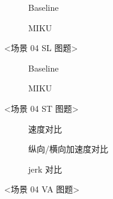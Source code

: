 \begin{figure}[H]
\centering
\begin{subfigure}[b]{\textwidth}
  \centering
  
  \caption{Baseline}
  \label{fig:exp_04_dense_construction_sl:a}
\end{subfigure}

\begin{subfigure}[b]{\textwidth}
  \centering
  
  \caption{MIKU}
  \label{fig:exp_04_dense_construction_sl:b}
\end{subfigure}
\caption{<场景 04 SL 图题>}
\label{fig:exp_04_dense_construction_sl}
\end{figure}

\begin{figure}[H]
\centering
\begin{subfigure}[b]{0.48\textwidth}
  \centering
  
  \caption{Baseline}
  \label{fig:exp_04_dense_construction_st:a}
\end{subfigure}\hfill
\begin{subfigure}[b]{0.48\textwidth}
  \centering
  
  \caption{MIKU}
  \label{fig:exp_04_dense_construction_st:b}
\end{subfigure}
\caption{<场景 04 ST 图题>}
\label{fig:exp_04_dense_construction_st}
\end{figure}

\begin{figure}[H]
\centering
\begin{subfigure}[b]{\textwidth}
  \centering
  
  \caption{速度对比}
  \label{fig:exp_04_dense_construction_va:a}
\end{subfigure}

\begin{subfigure}[b]{\textwidth}
  \centering
  
  \caption{纵向/横向加速度对比}
  \label{fig:exp_04_dense_construction_va:b}
\end{subfigure}

\begin{subfigure}[b]{\textwidth}
  \centering
  
  \caption{jerk 对比}
  \label{fig:exp_04_dense_construction_va:c}
\end{subfigure}
\caption{<场景 04 VA 图题>}
\label{fig:exp_04_dense_construction_va}
\end{figure}

